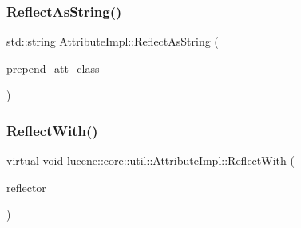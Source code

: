 \subsubsection{\texorpdfstring{Reflect\+As\+String()}{ReflectAsString()}}
{\footnotesize\ttfamily std\+::string Attribute\+Impl\+::\+Reflect\+As\+String (\begin{DoxyParamCaption}\item[{const bool}]{prepend\+\_\+att\+\_\+class }\end{DoxyParamCaption})}

\mbox{\label{classlucene_1_1core_1_1util_1_1AttributeImpl_a84d34275fb1ed67ac36fad7ff6388096}} 
\subsubsection{\texorpdfstring{Reflect\+With()}{ReflectWith()}}
{\footnotesize\ttfamily virtual void lucene\+::core\+::util\+::\+Attribute\+Impl\+::\+Reflect\+With (\begin{DoxyParamCaption}\item[{\mbox{\hyperlink{namespacelucene_1_1core_1_1util_a7dbb701adaed055f73fb95eec83da10a}{Attribute\+Reflector}} \&}]{reflector }\end{DoxyParamCaption})\hspace{0.3cm}{\ttfamily [pure virtual]}}



